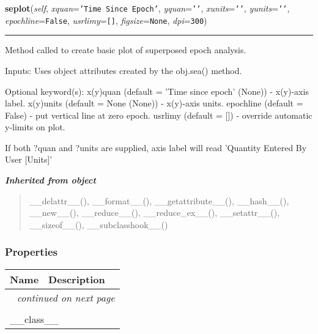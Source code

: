 \hspace{.8\funcindent}\begin{boxedminipage}{\funcwidth}

    \raggedright \textbf{seplot}(\textit{self}, \textit{xquan}={\tt \texttt{'}\texttt{Time Since Epoch}\texttt{'}}, \textit{yquan}={\tt \texttt{'}\texttt{}\texttt{'}}, \textit{xunits}={\tt \texttt{'}\texttt{}\texttt{'}}, \textit{yunits}={\tt \texttt{'}\texttt{}\texttt{'}}, \textit{epochline}={\tt False}, \textit{usrlimy}={\tt \texttt{[}\texttt{]}}, \textit{figsize}={\tt None}, \textit{dpi}={\tt 300})

    \vspace{-1.5ex}

    \rule{\textwidth}{0.5\fboxrule}
\setlength{\parskip}{2ex}
    Method called to create basic plot of superposed epoch analysis.

    Inputs: Uses object attributes created by the obj.sea() method.

    Optional keyword(s): x(y)quan (default = 'Time since epoch' (None)) - 
    x(y)-axis label. x(y)units (default = None (None)) - x(y)-axis units. 
    epochline (default = False) - put vertical line at zero epoch. usrlimy 
    (default = []) - override automatic y-limits on plot.

    If both ?quan and ?units are supplied, axis label will read 'Quantity 
    Entered By User [Units]'

\setlength{\parskip}{1ex}
    \end{boxedminipage}


\large{\textbf{\textit{Inherited from object}}}

\begin{quote}
\_\_delattr\_\_(), \_\_format\_\_(), \_\_getattribute\_\_(), \_\_hash\_\_(), \_\_new\_\_(), \_\_reduce\_\_(), \_\_reduce\_ex\_\_(), \_\_setattr\_\_(), \_\_sizeof\_\_(), \_\_subclasshook\_\_()
\end{quote}


  \subsubsection{Properties}

    \vspace{-1cm}
\hspace{\varindent}\begin{longtable}{|p{\varnamewidth}|p{\vardescrwidth}|l}
\cline{1-2}
\cline{1-2} \centering \textbf{Name} & \centering \textbf{Description}& \\
\cline{1-2}
\endhead\cline{1-2}\multicolumn{3}{r}{\small\textit{continued on next page}}\\\endfoot\cline{1-2}
\endlastfoot\multicolumn{2}{|l|}{\textit{Inherited from object}}\\
\multicolumn{2}{|p{\varwidth}|}{\raggedright \_\_class\_\_}\\
\cline{1-2}
\end{longtable}

